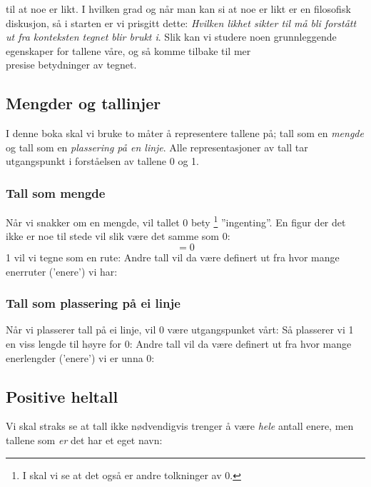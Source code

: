 \sym{$ = $}
til at noe er likt. I hvilken grad og når man kan si at noe er likt er en filosofisk diskusjon, så i starten er vi prisgitt dette: \textsl{Hvilken likhet
\sym{$ = $}
sikter til må bli forstått ut fra konteksten tegnet blir brukt i}. Slik kan vi studere noen grunnleggende egenskaper for tallene våre, og så komme tilbake til mer\\ presise betydninger av tegnet. \regv
{}
\subsection*{Mengder og tallinjer}
I denne boka skal vi bruke to måter å representere tallene på; tall som en \textsl{mengde} og tall som en \textsl{plassering på en linje}. Alle representasjoner av tall tar utgangspunkt i forståelsen av tallene 0 og 1.
\newpage
\subsubsection*{Tall som mengde}
	Når vi snakker om en mengde, vil tallet 0 bety\!\!
	\footnote{I  
	skal vi se at det også er andre tolkninger av 0.} 
	''ingenting''. En figur der det ikke er noe til stede vil slik være det samme som 0:
	\[ =0 \]
	1 vil vi tegne som en rute:
Andre tall vil da være definert ut fra hvor mange enerruter ('enere') vi har: \vs
\subsubsection*{Tall som plassering på ei linje}
	Når vi plasserer tall på ei linje, vil 0 være utgangspunket vårt:
	Så plasserer vi 1 en viss lengde til høyre for 0:
	Andre tall vil da være definert ut fra hvor mange enerlengder ('enere') vi er unna 0:
\subsection*{Positive heltall}
Vi skal straks se at tall ikke nødvendigvis trenger å være \textsl{hele} antall enere, men tallene som \textsl{er} det har et eget navn:\regv

